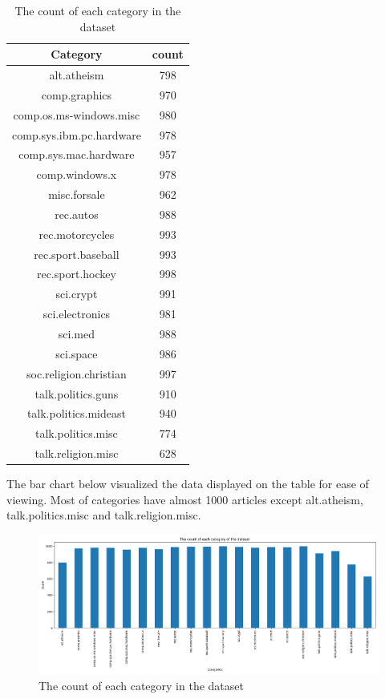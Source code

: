 \begin{table} [ht]
	\centering
	\begin{tabular} {|| c | c ||}
		\hline
		Category & count \\ [0.5ex]
		\hline\hline
		alt.atheism & 798 \\
		comp.graphics & 970 \\
		comp.os.ms-windows.misc & 980 \\
		comp.sys.ibm.pc.hardware & 978 \\
		comp.sys.mac.hardware & 957 \\
		comp.windows.x & 978 \\
		misc.forsale & 962 \\
		rec.autos & 988 \\
		rec.motorcycles & 993 \\
		rec.sport.baseball & 993 \\
		rec.sport.hockey & 998 \\
		sci.crypt & 991 \\
		sci.electronics & 981 \\
		sci.med & 988 \\
		sci.space & 986 \\
		soc.religion.christian & 997 \\
		talk.politics.guns & 910 \\
		talk.politics.mideast & 940 \\
		talk.politics.misc & 774 \\
		talk.religion.misc & 628 \\
		\hline
	\end{tabular}
	\caption{The count of each category in the dataset}
	\label{tbl:freqCount}
\end{table}

\clearpage
The bar chart below visualized the data displayed on the table for ease of viewing. Most of categories have almost 1000 articles except alt.atheism, talk.politics.misc and talk.religion.misc.

\begin{figure} [ht]
	\centering
	\includegraphics[width=\textwidth]{count}
	\caption{The count of each category in the dataset}
	\label{fig:freqCount}
\end{figure}


